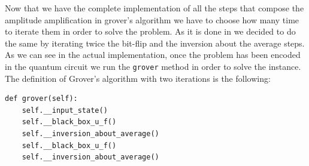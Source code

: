 \documentclass[english]{article}
\begin{document}
				\newpage
				Now that we have the complete implementation of all the steps that compose the amplitude amplification in grover's algorithm we have to choose how many time to iterate them in order to solve the problem. As it is done in \cite[G.Nannicini, 2020]{introNoPh} we decided to do the same by iterating twice the bit-flip and the inversion about the average steps. As we can see in the actual implementation, once the problem has been encoded in the quantum circuit we run the \texttt{grover} method in order to solve the instance. The definition of Grover's algorithm with two iterations is the following:
				\begin{lstlisting}
def grover(self):
    self.__input_state()
    self.__black_box_u_f()
    self.__inversion_about_average()
    self.__black_box_u_f()
    self.__inversion_about_average()
				\end{lstlisting}
				
\end{document}
